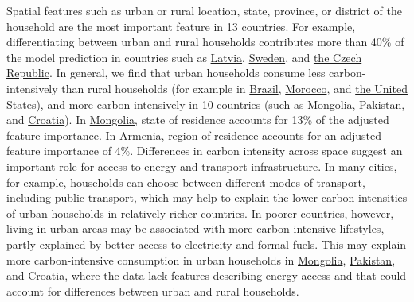 \documentclass[12pt, a4paper]{article}
\begin{document}
Spatial features such as urban or rural location, state, province, or district of the household are the most important feature in 13 countries. For example, differentiating between urban and rural households contributes more than 40\% of the model prediction in countries such as \hyperref[fig:5b_LVA]{Latvia}, \hyperref[fig:5b_SWE]{Sweden}, and \hyperref[fig:5b_CZE]{the Czech Republic}. In general, we find that urban households consume less carbon-intensively than rural households (for example in \hyperref[fig:5b_BRA]{Brazil}, \hyperref[fig:5b_MAR]{Morocco}, and \hyperref[fig:5b_USA]{the United States}), and more carbon-intensively in 10 countries (such as \hyperref[fig:5b_MNG]{Mongolia}, \hyperref[fig:5b_PAK]{Pakistan}, and \hyperref[fig:5b_HRV]{Croatia}). In \hyperref[fig:5b_MNG]{Mongolia}, state of residence accounts for 13\% of the adjusted feature importance. In \hyperref[fig:5b_ARM]{Armenia}, region of residence accounts for an adjusted feature importance of 4\%. Differences in carbon intensity across space suggest an important role for access to energy and transport infrastructure. In many cities, for example, households can choose between different modes of transport, including public transport, which may help to explain the lower carbon intensities of urban households in relatively richer countries. In poorer countries, however, living in urban areas may be associated with more carbon-intensive lifestyles, partly explained by better access to electricity and formal fuels. This may explain more carbon-intensive consumption in urban households in \hyperref[fig:5b_MNG]{Mongolia}, \hyperref[fig:5b_PAK]{Pakistan}, and \hyperref[fig:5b_HRV]{Croatia}, where the data lack features describing energy access and that could account for differences between urban and rural households.
\end{document}

